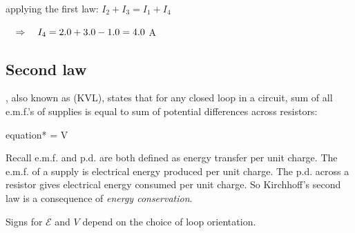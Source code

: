 
\begin{soln} applying the first law: $I_2 + I_3 = I_1 + I_4$
	
	\eqskip $\quad \Rightarrow \quad I_4 = 2.0 + 3.0 - 1.0 = 4.0$ A \end{soln}
	


\subsection{Second law}

\begin{ilight}
	, also known as  (KVL), states that for any closed loop in a circuit, sum of all e.m.f.'s of supplies is equal to sum of potential differences across resistors: \begin{empheq}[box=\tcbhighmath]{equation*}{\sum {} = \sum V }\end{empheq}
\end{ilight}

Recall e.m.f. and p.d. are both defined as energy transfer per unit charge. The e.m.f. of a supply is electrical energy produced per unit charge. The p.d. across a resistor gives electrical energy consumed per unit charge.
So Kirchhoff's second law is a consequence of \emph{energy conservation}.

Signs for $\mathcal{E}$ and $V$ depend on the choice of loop orientation.

